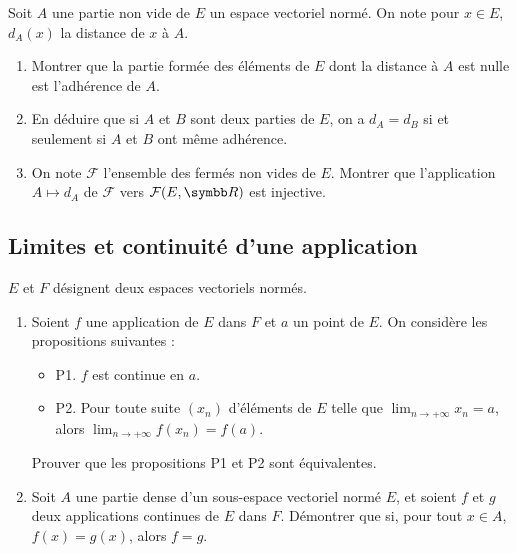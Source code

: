 \begin{exercice}
    Soit $A$ une partie non vide de $E$ un espace vectoriel normé. On note pour $x \in E$, $d_{A}(x)$ la distance de $x$ à $A$.
    \begin{enumerate}
        \item Montrer que la partie formée des éléments de $E$ dont la distance à $A$ est nulle est l'adhérence de $A$.
        \item En déduire que si $A$ et $B$ sont deux parties de $E$, on a $d_{A} = d_{B}$ si et seulement si $A$ et $B$ ont même adhérence.
        \item On note $\mathcal{F}$ l'ensemble des fermés non vides de $E$. 
            Montrer que l'application $A \mapsto d_{A}$ de $\mathcal{F}$ vers $\mathcal{F}(E, \R)$ est injective.
    \end{enumerate}
\end{exercice}

\subsection{Limites et continuité d'une application}

\begin{exercice}
    $E$ et $F$ désignent deux espaces vectoriels normés.
    \begin{enumerate}
        \item Soient $f$ une application de $E$ dans $F$ et $a$ un point de $E$. On considère les propositions suivantes :
        \begin{itemize}
            \item P1. $f$ est continue en $a$.
            \item P2. Pour toute suite $(x_{n})$ d'éléments de $E$ telle que $\lim_{n \rightarrow +\infty} x_{n} = a$, 
                alors $\lim_{n \rightarrow +\infty} f(x_{n}) = f(a)$.
        \end{itemize}
            Prouver que les propositions P1 et P2 sont équivalentes.
        \item Soit $A$ une partie dense d'un sous-espace vectoriel normé $E$, et soient $f$ et $g$ deux applications continues de $E$ dans $F$. 
            Démontrer que si, pour tout $x \in A$, $f(x)=g(x)$, alors $f=g$.
    \end{enumerate}
\end{exercice}

